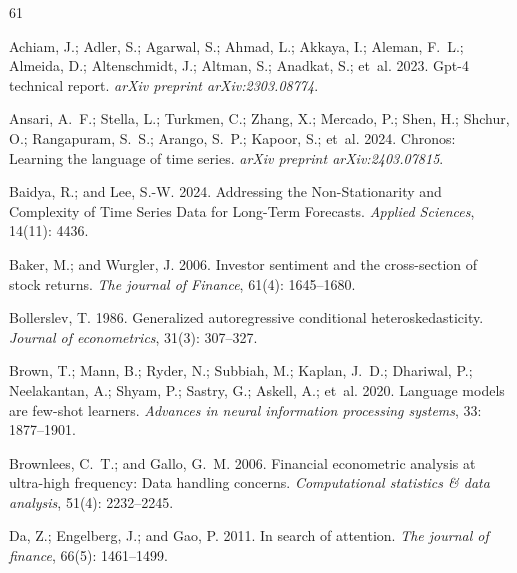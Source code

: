 \documentclass[letterpaper]{article} %
\begin{document}
\begin{thebibliography}{61}
\providecommand{\natexlab}[1]{#1}

Achiam, J.; Adler, S.; Agarwal, S.; Ahmad, L.; Akkaya, I.; Aleman, F.~L.;
  Almeida, D.; Altenschmidt, J.; Altman, S.; Anadkat, S.; et~al. 2023.
\newblock Gpt-4 technical report.
\newblock \emph{arXiv preprint arXiv:2303.08774}.

Ansari, A.~F.; Stella, L.; Turkmen, C.; Zhang, X.; Mercado, P.; Shen, H.;
  Shchur, O.; Rangapuram, S.~S.; Arango, S.~P.; Kapoor, S.; et~al. 2024.
\newblock Chronos: Learning the language of time series.
\newblock \emph{arXiv preprint arXiv:2403.07815}.

Baidya, R.; and Lee, S.-W. 2024.
\newblock Addressing the Non-Stationarity and Complexity of Time Series Data
  for Long-Term Forecasts.
\newblock \emph{Applied Sciences}, 14(11): 4436.

Baker, M.; and Wurgler, J. 2006.
\newblock Investor sentiment and the cross-section of stock returns.
\newblock \emph{The journal of Finance}, 61(4): 1645--1680.

Bollerslev, T. 1986.
\newblock Generalized autoregressive conditional heteroskedasticity.
\newblock \emph{Journal of econometrics}, 31(3): 307--327.

Brown, T.; Mann, B.; Ryder, N.; Subbiah, M.; Kaplan, J.~D.; Dhariwal, P.;
  Neelakantan, A.; Shyam, P.; Sastry, G.; Askell, A.; et~al. 2020.
\newblock Language models are few-shot learners.
\newblock \emph{Advances in neural information processing systems}, 33:
  1877--1901.

Brownlees, C.~T.; and Gallo, G.~M. 2006.
\newblock Financial econometric analysis at ultra-high frequency: Data handling
  concerns.
\newblock \emph{Computational statistics \& data analysis}, 51(4): 2232--2245.

Da, Z.; Engelberg, J.; and Gao, P. 2011.
\newblock In search of attention.
\newblock \emph{The journal of finance}, 66(5): 1461--1499.


\end{thebibliography}
\end{document}

